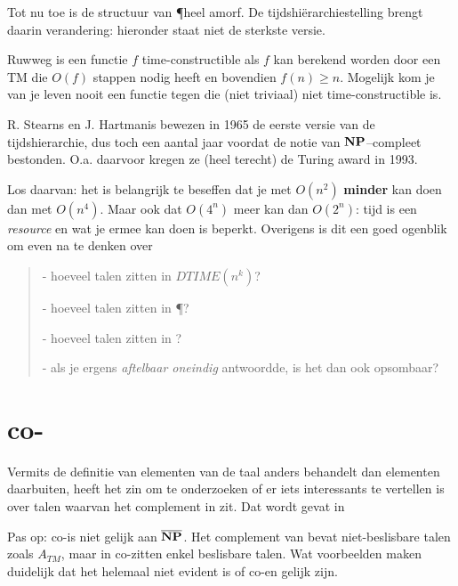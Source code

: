 Tot nu toe is de structuur van \P heel amorf. De
tijdshi\"erarchiestelling brengt daarin verandering: hieronder staat
niet de sterkste versie.


Ruwweg is een functie $f$ time-constructible als $f$ kan berekend
worden door een TM die $O(f)$ stappen nodig heeft en bovendien $f(n)
\geq n$. Mogelijk kom je van je leven nooit een functie tegen die
(niet triviaal) niet time-constructible is.

R. Stearns en J. Hartmanis bewezen in 1965 de eerste versie van de
tijdshierarchie, dus toch een aantal jaar voordat de notie van
${\bf NP}$--compleet bestonden. O.a. daarvoor kregen ze (heel terecht) de
Turing award in 1993.

Los daarvan: het is belangrijk te beseffen dat je met $O(n^2)$ {\bf
  minder} kan doen dan met $O(n^4)$. Maar ook dat $O(4^n)$ meer kan
dan $O(2^n)$: tijd is een {\em resource} en wat je ermee kan doen is
beperkt. Overigens is dit een goed ogenblik om even na te denken over
\begin{verse}
- hoeveel talen zitten in $DTIME(n^k)$?

- hoeveel talen zitten in \P?

- hoeveel talen zitten in \NP?

- als je ergens {\em aftelbaar oneindig} antwoordde, is het dan ook opsombaar?
\end{verse}


\section{co-\NP}

Vermits de definitie van \NP elementen van de taal anders behandelt
dan elementen daarbuiten, heeft het zin om te onderzoeken of er iets
interessants te vertellen is over talen waarvan het complement in \NP
zit. Dat wordt gevat in


Pas op: co-\NP is niet gelijk aan $\overline{{\bf NP}}$. Het complement van
\NP bevat niet-beslisbare talen zoals $A_{TM}$, maar in co-\NP zitten
enkel beslisbare talen. Wat voorbeelden maken duidelijk dat het
helemaal niet evident is of co-\NP en \NP gelijk zijn.

